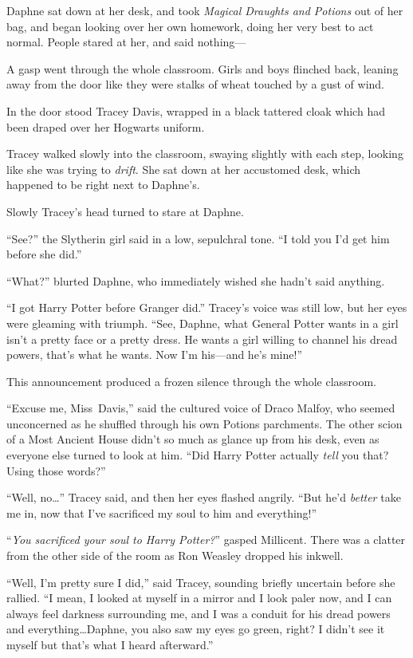 Daphne sat down at her desk, and took \emph{Magical Draughts and Potions} out of her bag, and began looking over her own homework, doing her very best to act normal. People stared at her, and said nothing—

A gasp went through the whole classroom. Girls and boys flinched back, leaning away from the door like they were stalks of wheat touched by a gust of wind.

In the door stood Tracey Davis, wrapped in a black tattered cloak which had been draped over her Hogwarts uniform.

Tracey walked slowly into the classroom, swaying slightly with each step, looking like she was trying to \emph{drift}. She sat down at her accustomed desk, which happened to be right next to Daphne’s.

Slowly Tracey’s head turned to stare at Daphne.

“See?” the Slytherin girl said in a low, sepulchral tone. “I told you I’d get him before she did.”

“What?” blurted Daphne, who immediately wished she hadn’t said anything.

“I got Harry Potter before Granger did.” Tracey’s voice was still low, but her eyes were gleaming with triumph. “See, Daphne, what General Potter wants in a girl isn’t a pretty face or a pretty dress. He wants a girl willing to channel his dread powers, that’s what he wants. Now I’m his—and he’s mine!”

This announcement produced a frozen silence through the whole classroom.

“Excuse me, Miss~Davis,” said the cultured voice of Draco Malfoy, who seemed unconcerned as he shuffled through his own Potions parchments. The other scion of a Most Ancient House didn’t so much as glance up from his desk, even as everyone else turned to look at him. “Did Harry Potter actually \emph{tell} you that? Using those words?”

“Well, no…” Tracey said, and then her eyes flashed angrily. “But he’d \emph{better} take me in, now that I’ve sacrificed my soul to him and everything!”

“\emph{You sacrificed your soul to Harry Potter?}” gasped Millicent. There was a clatter from the other side of the room as Ron Weasley dropped his inkwell.

“Well, I’m pretty sure I did,” said Tracey, sounding briefly uncertain before she rallied. “I mean, I looked at myself in a mirror and I look paler now, and I can always feel darkness surrounding me, and I was a conduit for his dread powers and everything…Daphne, you also saw my eyes go green, right? I didn’t see it myself but that’s what I heard afterward.”


